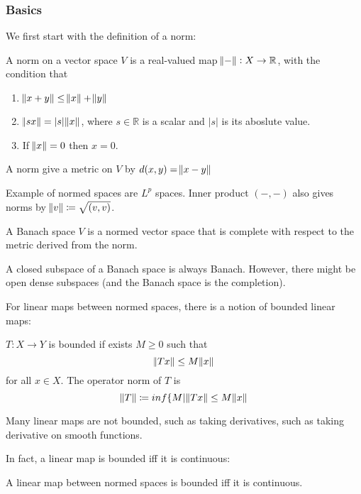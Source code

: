 \documentclass[main.tex]{subfiles}
\begin{document}
\subsubsection{Basics}

We first start with the definition of a norm:

\begin{definition}
A norm on a vector space $V$ is a real-valued map $\norm{-} : X \rightarrow \mathbb{R}$, with the condition that 
\begin{enumerate}
    \item $\norm{x + y} \leq \norm{x} + \norm{y}$
    \item $\norm{s x} = |s| \norm{x}$, where $s \in \mathbb{R}$ is a scalar and $|s|$ is its aboslute value.
    \item If $\norm{x} = 0$ then $x = 0$.
\end{enumerate}

A norm give a metric on $V$ by $d(x, y) = \norm{x -y}$
\end{definition}

\begin{example}
Example of normed spaces are $L^p$ spaces. Inner product $(-,-)$ also gives norms by $\norm{v} \coloneqq \sqrt{(v,v)}$. 
\end{example}


\begin{definition}
A Banach space $V$ is a normed vector space that is complete with respect to the metric derived from the norm.
\end{definition}

A closed subspace of a Banach space is always Banach. However, there might be open dense subspaces (and the Banach space is the completion).

For linear maps between normed spaces, there is a notion of bounded linear maps:

\begin{definition}
$T: X \rightarrow Y$ is bounded if exists $M \geq 0$ such that 
$$
\norm{Tx} \leq M \norm{x}
$$
for all $x \in X$. The operator norm of $T$ is 
$$
\norm{T} \coloneqq inf \{ M | \norm{Tx} \leq M \norm{x}
$$
\end{definition}


Many linear maps are not bounded, such as taking derivatives, such as taking derivative on smooth functions. 

In fact, a linear map is bounded iff it is continuous:

\begin{theorem}
A linear map between normed spaces is bounded iff it is continuous.
\end{theorem}
\end{document}

